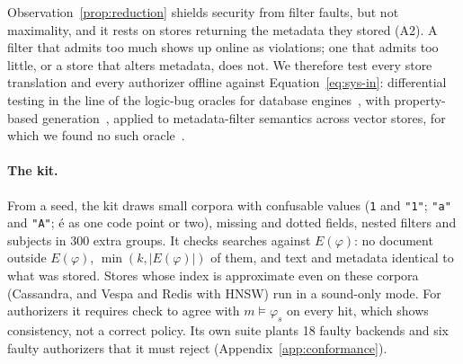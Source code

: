 
Observation~\ref{prop:reduction} shields security from filter faults, but not maximality, and it
rests on stores returning the metadata they stored (A2). A filter that admits too much shows up
online as violations; one that admits too little, or a store that alters metadata, does not. We
therefore test every store translation and every authorizer offline against
Equation~\ref{eq:sys-in}: differential testing in the line of the logic-bug oracles for database
engines~\cite{rigger2020testing}, with property-based generation~\cite{maciver2019hypothesis}, applied to
metadata-filter semantics across vector stores, for which we found no such
oracle~\cite{xie2025toward,wang2025towards}.

\paragraph{The kit.}
From a seed, the kit draws small corpora with confusable values (\texttt{1} and \texttt{"1"}; \texttt{"a"}
and \texttt{"A"}; \'e as one code point or two), missing and dotted fields, nested filters and subjects in 300 extra groups.
It checks searches against $E(\varphi)$: no document outside
$E(\varphi)$, $\min(k,|E(\varphi)|)$ of them, and text and metadata identical to what was stored. Stores whose
index is approximate even on these corpora (Cassandra, and Vespa and Redis with HNSW) run in a sound-only mode. For
authorizers it requires $\mathrm{check}$ to agree with $m \models \varphi_s$ on every hit, which shows consistency, not
a correct policy. Its own suite plants 18 faulty backends and six faulty authorizers that it must reject
(Appendix~\ref{app:conformance}).

